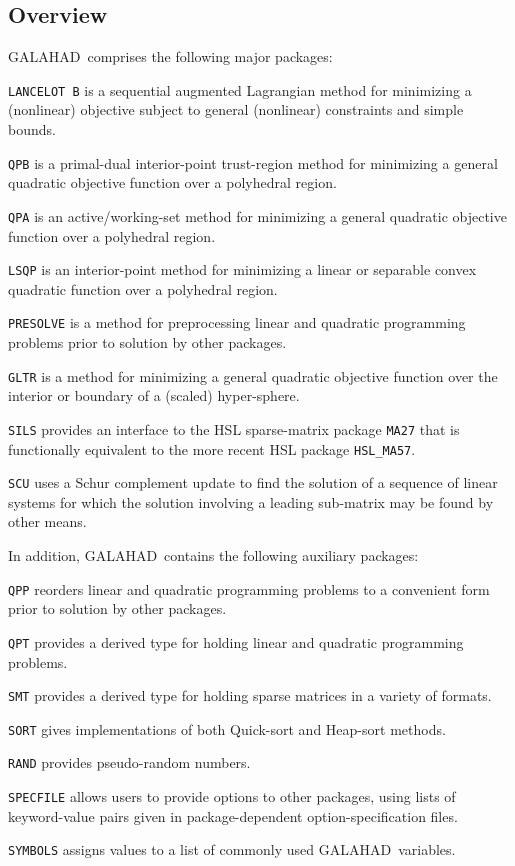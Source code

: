 \documentclass[acmtocl,acmnow]{acmtrans2m}
\newcommand{\gal}{{\sf GALAHAD}}
\newcommand{\itt}[1]{\item{{\tt #1}}}
\newcommand{\lsubsection}[1]{\subsection{#1} \label{#1}}
\begin{document}
\lsubsection{Overview}

\gal\ comprises the following major packages:

\begin{description}

\itt{LANCELOT B} is a sequential augmented Lagrangian method for 
minimizing a (nonlinear) objective subject to general (nonlinear) constraints
and simple bounds.

\itt{QPB} is a primal-dual interior-point trust-region method for 
minimizing a general quadratic objective function over a polyhedral region.

\itt{QPA} is an active/working-set method for 
minimizing a general quadratic objective function over a polyhedral region.

\itt{LSQP} is an interior-point method for minimizing a linear or 
separable convex quadratic function over a polyhedral region.

\itt{PRESOLVE} is a method for preprocessing linear and quadratic programming 
problems prior to solution by other packages.

\itt{GLTR} is a method for minimizing a general quadratic objective function 
over the interior or boundary of a (scaled) hyper-sphere.

\itt{SILS} provides an interface to the HSL sparse-matrix package {\tt MA27} 
that is functionally equivalent to the more recent HSL package {\tt HSL\_MA57}.

\itt{SCU} uses a Schur complement update to find the solution of 
a sequence of linear systems for which the solution
involving a leading sub-matrix may be found by other means.

\end{description}
In addition, \gal\ contains the following auxiliary packages:

\begin{description}

\itt{QPP} reorders linear and quadratic programming 
problems to a convenient form prior to solution by other packages.

\itt{QPT} provides a derived type for holding linear and quadratic programming 
problems.

\itt{SMT} provides a derived type for holding sparse matrices in a variety of
formats.

\itt{SORT} gives implementations of both Quick-sort and Heap-sort methods.

\itt{RAND} provides pseudo-random numbers.

\itt{SPECFILE} allows users to provide options to other packages, using lists
of keyword-value pairs given in package-dependent option-specification files.

\itt{SYMBOLS} assigns values to a list of commonly used \gal\ variables.

\end{description}
\end{document}

